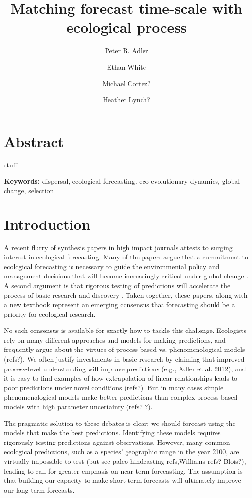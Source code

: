 \documentclass[11pt]{article}
\title{\textbf{ Matching forecast time-scale with ecological process }}
\author[1]{Peter B. Adler}  %
\author[2]{Ethan White}
\author[1]{Michael Cortez?}
\author[3]{Heather Lynch?}
\affil[1]{Department of Wildland Resources and the Ecology Center, Utah State University, Logan, Utah}
\affil[2]{some shitty Florida joint}
\begin{document}
\maketitle

\linenumbers

\section*{Abstract}

stuff

\textbf{\large{Keywords:}} dispersal, ecological forecasting, eco-evolutionary dynamics, global change, selection

\section*{Introduction}

A recent flurry of synthesis papers in high impact journals attests to surging interest in ecological forecasting. Many of the papers 
argue that a commitment to ecological forecasting is necessary to guide the environmental policy and management
decisions that will become increasingly critical under global change \citep{clark_ecological_2001,mouquet_review:_2015,dietze_iterative_2018}.
A second argument is that rigorous testing of predictions will accelerate the process of basic research and discovery 
\citep{houlahan_priority_2017,dietze_prediction_2017,dietze_iterative_2018}.
Taken together, these papers, along with a new textbook \citep{dietze_ecological_2017} represent an emerging consensus that 
forecasting should be a priority for ecological research.

No such consensus is available for exactly how to tackle this challenge.
Ecologists rely on many different approaches and models for making predictions, and 
frequently argue about the virtues of process-based vs. phenomenological models (refs?).
We often justify investments in basic research by claiming that improved process-level understanding will improve predictions (e.g., Adler et al. 2012),
and it is easy to find examples of how extrapolation of linear relationships leads to poor predictions under novel conditions (refs?).
But in many cases simple phenomenological models make better predictions than complex process-based models with high parameter
uncertainty (refs? \cite{tredennick_we_2017}?).

The pragmatic solution to these debates is clear: we should forecast using the models that make the best predictions.
Identifying these models requires rigorously testing predictions against observations. However, many common ecological predictions,
such as a species' geographic range in the year 2100, are virtually impossible to test (but see paleo hindcasting refs,Williams refs? Blois?), 
leading \citep{dietze_iterative_2018} to call for greater emphasis on near-term forecasting. The assumption is that building 
our capacity to make short-term forecasts will ultimately improve our long-term forecasts.
\end{document}
